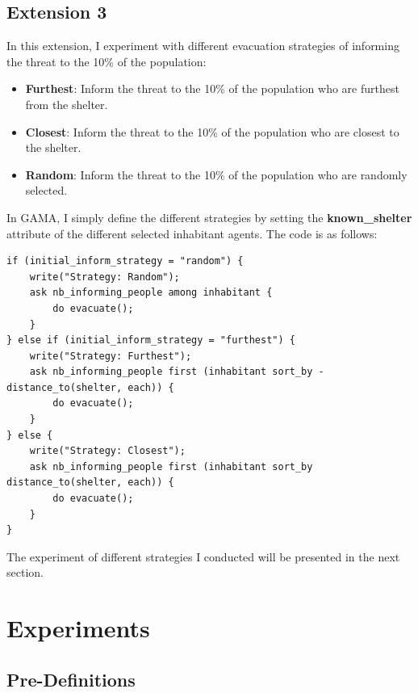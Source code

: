 \documentclass[12pt]{article}
\begin{document}
\subsection{Extension 3}

In this extension, I experiment with different evacuation strategies of informing the threat to the 10\% of the population: 
\begin{itemize}
    \item \textbf{Furthest}: Inform the threat to the 10\% of the population who are furthest from the shelter.
    \item \textbf{Closest}: Inform the threat to the 10\% of the population who are closest to the shelter.
    \item \textbf{Random}: Inform the threat to the 10\% of the population who are randomly selected.
\end{itemize}

In GAMA, I simply define the different strategies by setting the \textbf{known\_shelter} attribute of the different selected inhabitant agents. The code is as follows:

\begin{codebox}
\begin{lstlisting}[style=GAML]
if (initial_inform_strategy = "random") {
    write("Strategy: Random");
    ask nb_informing_people among inhabitant {
        do evacuate();
    }
} else if (initial_inform_strategy = "furthest") {
    write("Strategy: Furthest");
    ask nb_informing_people first (inhabitant sort_by -distance_to(shelter, each)) {
        do evacuate();
    }
} else {
    write("Strategy: Closest");
    ask nb_informing_people first (inhabitant sort_by distance_to(shelter, each)) {
        do evacuate();
    }
}
\end{lstlisting}
\end{codebox}

The experiment of different strategies I conducted will be presented in the next section.

\section{Experiments}


\subsection{Pre-Definitions}
\end{document}
